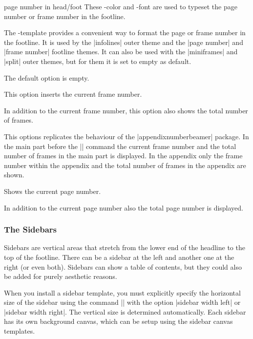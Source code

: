 \begin{element}{page number in head/foot}\yes\yes\yes
  These \beamer-color and -font are used to typeset the page number or frame number in the footline.
  
  The \beamer-template provides a convenient way to format the page or frame number in the footline. It is used by the |infolines| outer theme and the |page number| and |frame number| footline themes. It can also be used with the |miniframes| and |split| outer themes, but for them it is set to empty as default.
  
  \begin{templateoptions}
     The default option is empty.
    
     This option inserts the current frame number.
    
     In addition to the current frame number, this option also shows the total number of frames. 
    
     This options replicates the behaviour of the |appendixnumberbeamer| package. In the main part before the |\appendix| command the current frame number and the total number of frames in the main part is displayed. In the appendix only the frame number within the appendix and the total number of frames in the appendix are shown.

     Shows the current page number.
    
     In addition to the current page number also the total page number is displayed.
  \end{templateoptions}
   
\end{element}

\subsubsection{The Sidebars}

Sidebars are vertical areas that stretch from the lower end of the headline to the top of the footline. There can be a sidebar at the left and another one at the right (or even both). Sidebars can show a table of contents, but they could also be added for purely aesthetic reasons.

When you install a sidebar template, you must explicitly specify the horizontal size of the sidebar using the command |\setbeamersize| with the option |sidebar width left| or |sidebar width right|. The vertical size is determined automatically. Each sidebar has its own background canvas, which can be setup using the sidebar canvas templates.

